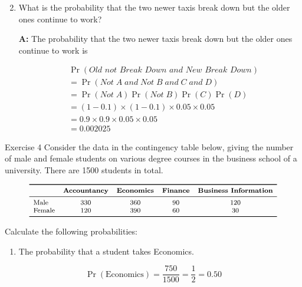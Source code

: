 \documentclass[
  ignorenonframetext,
  aspectratio=43,
]{beamer}
\providecommand{\tightlist}{%
  \setlength{\itemsep}{0pt}\setlength{\parskip}{0pt}}\usepackage{longtable,booktabs,array}
\let\olditem\item
\renewcommand\item{\olditem\justifying}
\begin{document}
\begin{frame}{}
\protect\hypertarget{section}{}
\begin{enumerate}
\setcounter{enumi}{1}
\item
  What is the probability that the two newer taxis break down but the
  older ones continue to work?

  \pause

  \textbf{A:} The probability that the two newer taxis break down but
  the older ones continue to work is

  \[
   \begin{aligned}
   & \Pr(\textit{Old not Break Down and New Break Down}) \\ 
   & = \Pr(Not \; A \; and \; Not \; B \; and \; C \; and \; D) \\
   & = \Pr(Not \; A)\Pr(Not \; B)\Pr(C)\Pr(D) \\
   & = (1 - 0.1) \times (1 - 0.1) \times 0.05 \times 0.05 \\
   & = 0.9 \times 0.9 \times 0.05 \times 0.05 \\
   & = 0.002025
   \end{aligned}
   \]
\end{enumerate}
\end{frame}

\begin{frame}{Exercise 4}
\protect\hypertarget{exercise-4}{}
Consider the data in the contingency table below, giving the number of
male and female students on various degree courses in the business
school of a university. There are 1500 students in total. \vspace{-5pt}

\[
\footnotesize
\begin{array}{lcccc}
\toprule
 & \textbf{Accountancy} & \textbf{Economics} & \textbf{Finance} & \textbf{Business Information} \\
\midrule
\text{Male}   & 330 & 360 & 90 & 120 \\
\text{Female} & 120 & 390 & 60 & 30 \\
\bottomrule
\end{array}
\]

\vspace{10pt}

Calculate the following probabilities:

\begin{enumerate}
\tightlist
\item
  The probability that a student takes Economics.
\end{enumerate}

\pause

\[
\Pr(\text{Economics}) = \frac{750}{1500} = \frac{1}{2} = 0.50
\]
\end{frame}
\end{document}
